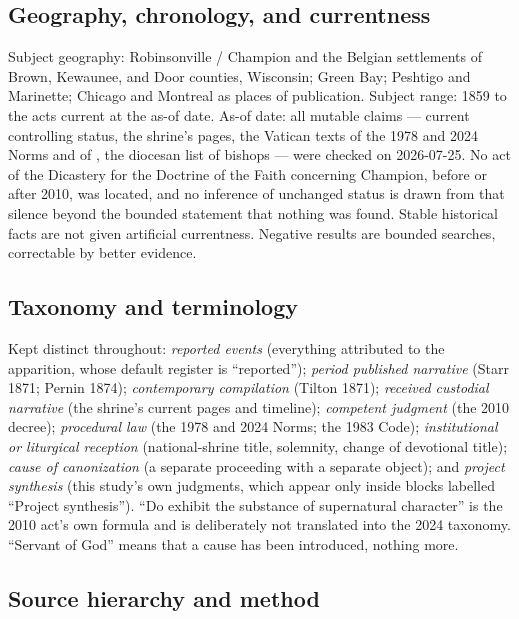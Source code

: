 \subsection*{Geography, chronology, and currentness}

Subject geography: Robinsonville / Champion and the Belgian settlements
of Brown, Kewaunee, and Door counties, Wisconsin; Green Bay; Peshtigo
and Marinette; Chicago and Montreal as places of publication. Subject
range: 1859 to the acts current at the as-of date. As-of date: all
mutable claims --- current controlling status, the shrine's pages, the
Vatican texts of the 1978 and 2024 Norms and of ,
the diocesan list of bishops --- were checked on 2026-07-25. No act of
the Dicastery for the Doctrine of the Faith concerning Champion, before
or after 2010, was located, and no inference of unchanged status is
drawn from that silence beyond the bounded statement that nothing was
found. Stable historical facts are not given artificial currentness.
Negative results are bounded searches, correctable by better evidence.

\subsection*{Taxonomy and terminology}

Kept distinct throughout: \emph{reported events} (everything
attributed to the apparition, whose default register is ``reported'');
\emph{period published narrative} (Starr 1871; Pernin 1874);
\emph{contemporary compilation} (Tilton 1871); \emph{received custodial
narrative} (the shrine's current pages and timeline); \emph{competent
judgment} (the 2010 decree); \emph{procedural law} (the 1978 and 2024
Norms; the 1983 Code); \emph{institutional or liturgical reception}
(national-shrine title, solemnity, change of devotional title);
\emph{cause of canonization} (a separate proceeding with a separate
object); and \emph{project synthesis} (this study's own judgments,
which appear only inside blocks labelled ``Project synthesis''). ``Do
exhibit the substance of supernatural character'' is the 2010 act's own
formula and is deliberately not translated into the 2024 taxonomy.
``Servant of God'' means that a cause has been introduced, nothing
more.

\subsection*{Source hierarchy and method}

